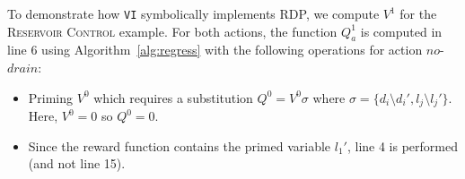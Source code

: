 \documentclass[letterpaper]{article}
\begin{document}
To demonstrate how \texttt{VI} symbolically implements RDP, we compute $V^1$ for the \textsc{Reservoir Control} example. For both actions, the function $Q^1_a$ is computed in line 6 using Algorithm~\ref{alg:regress} with the following operations for action $\mathit{no}$-$\mathit{drain}$:
\begin{itemize}

\item Priming $V^0$ which %
requires a substitution $Q^0= V^0 \sigma$ where $\sigma = \lbrace d_i \setminus d_i' , l_j \setminus l_j' \rbrace$.  Here, $V^0=0$ so $Q^0=0$.

\item Since the reward function contains the primed variable $l_1'$, line 4 is performed (and not line 15). 


\end{itemize}
\end{document}
